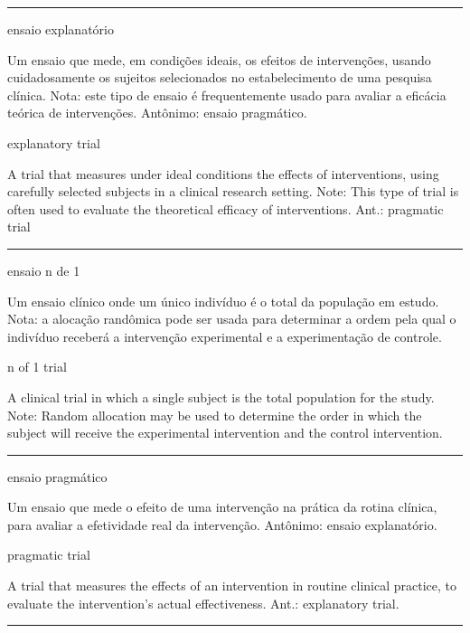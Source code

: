 \documentclass[
  openany]{book}
\begin{document}
\begin{center}\rule{0.5\linewidth}{0.5pt}\end{center}

ensaio explanatório

Um ensaio que mede, em condições ideais, os efeitos de intervenções, usando cuidadosamente os sujeitos selecionados no estabelecimento de uma pesquisa clínica. Nota: este tipo de ensaio é frequentemente usado para avaliar a eficácia teórica de intervenções. Antônimo: ensaio pragmático.

explanatory trial

A trial that measures under ideal conditions the effects of interventions, using carefully selected subjects in a clinical research setting. Note: This type of trial is often used to evaluate the theoretical efficacy of interventions. Ant.: pragmatic trial

\begin{center}\rule{0.5\linewidth}{0.5pt}\end{center}

ensaio n de 1

Um ensaio clínico onde um único indivíduo é o total da população em estudo. Nota: a alocação randômica pode ser usada para determinar a ordem pela qual o indivíduo receberá a intervenção experimental e a experimentação de controle.

n of 1 trial

A clinical trial in which a single subject is the total population for the study. Note: Random allocation may be used to determine the order in which the subject will receive the experimental intervention and the control intervention.

\begin{center}\rule{0.5\linewidth}{0.5pt}\end{center}

ensaio pragmático

Um ensaio que mede o efeito de uma intervenção na prática da rotina clínica, para avaliar a efetividade real da intervenção. Antônimo: ensaio explanatório.

pragmatic trial

A trial that measures the effects of an intervention in routine clinical practice, to evaluate the intervention's actual effectiveness. Ant.: explanatory trial.

\begin{center}\rule{0.5\linewidth}{0.5pt}\end{center}
\end{document}
